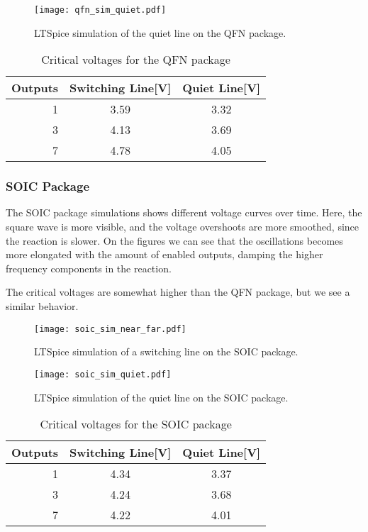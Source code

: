 \documentclass[../main.tex]{subfiles}
\begin{document}
\newpage

\begin{figure}[h]
    \centering
    \texttt{[image: qfn\_sim\_quiet.pdf]}
    \caption{LTSpice simulation of the quiet line on the QFN package.}
    \label{fig:qfn_sim_quiet}
\end{figure}

\begin{table}[h]
    \centering
    \begin{tabular}{r|c c}
        \toprule[1pt]
        \textbf{Outputs} & \textbf{Switching Line[V]} &\textbf{Quiet Line[V]} \\
        \midrule
        1  & 3.59  & 3.32 \\
        3  & 4.13  & 3.69 \\
        7  & 4.78  & 4.05  \\
        \bottomrule[1pt]
    \end{tabular}
    \caption{Critical voltages for the QFN package}
\end{table}

\subsubsection{SOIC Package}

The SOIC package simulations shows different voltage curves over time. Here, the square wave is more visible,
and the voltage overshoots are more smoothed, since the reaction is slower. 
On the figures we can see that the oscillations becomes more elongated with the amount of enabled outputs, damping the higher
frequency components in the reaction. 

The critical voltages are somewhat higher than the QFN package, but we see a similar behavior.

\begin{figure}[h]
    \centering
    \texttt{[image: soic\_sim\_near\_far.pdf]}
    \caption{LTSpice simulation of a switching line on the SOIC package.}
    \label{fig:soic_sim_near_far}
\end{figure}

\newpage

\begin{figure}[h]
    \centering
    \texttt{[image: soic\_sim\_quiet.pdf]}
    \caption{LTSpice simulation of the quiet line on the SOIC package.}
    \label{fig:soic_sim_quiet}
\end{figure}

\newpage

\begin{table}[h]
    \centering
    \begin{tabular}{r|c c}
        \toprule[1pt]
        \textbf{Outputs} & \textbf{Switching Line[V]} &\textbf{Quiet Line[V]} \\
        \midrule
        1  & 4.34  & 3.37 \\
        3  & 4.24  & 3.68 \\
        7  & 4.22  & 4.01  \\
        \bottomrule[1pt]
    \end{tabular}
    \caption{Critical voltages for the SOIC package}
\end{table}
\end{document}
